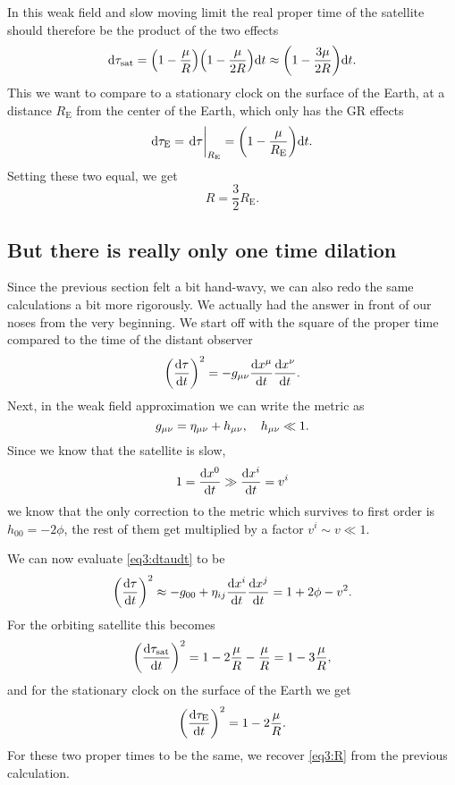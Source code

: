 \documentclass[11pt,a4paper, 
swedish, english %
]{article}
\newcommand{\E}{\text{E}}
\begin{document}
In this weak field and slow moving limit the real proper time of the
satellite should therefore be the product of the two effects
\begin{equation}
\mathrm{d}\tau_\text{sat}=\qty(1-\frac{\mu}{R})\qty(1-\frac{\mu}{2R})\mathrm{d}{t}
\approx\qty(1-\frac{3\mu}{2R})\mathrm{d}{t}.
\end{equation}
This we want to compare to a stationary clock on the surface of the
Earth, at a distance $R_\E$ from the center of the Earth, which only
has the GR effects 
\begin{equation}
\rd\tau_\E=\eval{\rd\tau}_{R_\E}=\qty(1-\frac{\mu}{R_\E})\rd{t}.
\end{equation}
Setting these two equal, we get
\begin{equation}\label{eq3:R}
R=\frac{3}{2}R_\E.
\end{equation}


\subsection{But there is really only one time dilation}
Since the previous section felt a bit hand-wavy, we can also redo the
same calculations a bit more rigorously. We actually had the answer in
front of our noses from the very beginning. We start off with the
square of the proper time compared to the time of the distant observer 
\begin{equation}\label{eq3:dtaudt}
\qty(\frac{\mathrm{d}\tau}{\mathrm{d}{t}})^2=
-g_{\mu\nu}\frac{\mathrm{d}{x}^\mu}{\mathrm{d}{t}}\frac{\mathrm{d}{x}^\nu}{\mathrm{d}{t}}.
\end{equation}
Next, in the weak field approximation we can write the metric as
\begin{equation}
g_{\mu\nu}=\eta_{\mu\nu}+h_{\mu\nu}\qc h_{\mu\nu}\ll1.
\end{equation}
Since we know that the satellite is slow,
\begin{equation}
1=\dv{x^0}{t}\gg\dv{x^i}{t}= v^i
\end{equation}
we know that the only correction to the metric which survives to first
order is $h_{00}=-2\phi$, the rest of them get multiplied by a factor
$v^i\sim v\ll1$.

We can now evaluate \eqref{eq3:dtaudt} to be
\begin{equation}
\qty(\frac{\mathrm{d}\tau}{\mathrm{d}{t}})^2\approx
-g_{00}+\eta_{ij}\frac{\mathrm{d}{x}^i}{\mathrm{d}{t}}\frac{\mathrm{d}{x}^j}{\mathrm{d}{t}}
=1+2\phi-v^2.
\end{equation}
For the orbiting satellite this becomes
\begin{equation}
\qty(\frac{\mathrm{d}\tau_\text{sat}}{\mathrm{d}{t}})^2
=1-2\frac{\mu}{R}-\frac{\mu}{R}
=1-3\frac{\mu}{R},
\end{equation}
and for the stationary clock on the surface of the Earth we get
\begin{equation}
\qty(\frac{\mathrm{d}\tau_\text{E}}{\mathrm{d}{t}})^2=1-2\frac{\mu}{R}.
\end{equation}
For these two proper times to be the same, we recover \eqref{eq3:R}
from the previous calculation.
\end{document}
